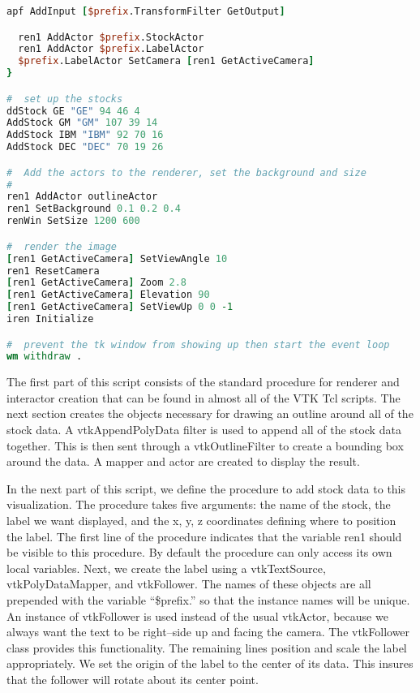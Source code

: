 \begin{lstlisting}[language=TCL, caption={Tcl script for stock case study.}]
  apf AddInput [$prefix.TransformFilter GetOutput]

  ren1 AddActor $prefix.StockActor
  ren1 AddActor $prefix.LabelActor
  $prefix.LabelActor SetCamera [ren1 GetActiveCamera]
}

#  set up the stocks
ddStock GE "GE" 94 46 4
AddStock GM "GM" 107 39 14
AddStock IBM "IBM" 92 70 16
AddStock DEC "DEC" 70 19 26

#  Add the actors to the renderer, set the background and size
#
ren1 AddActor outlineActor
ren1 SetBackground 0.1 0.2 0.4
renWin SetSize 1200 600

#  render the image
[ren1 GetActiveCamera] SetViewAngle 10
ren1 ResetCamera
[ren1 GetActiveCamera] Zoom 2.8
[ren1 GetActiveCamera] Elevation 90
[ren1 GetActiveCamera] SetViewUp 0 0 -1
iren Initialize

#  prevent the tk window from showing up then start the event loop
wm withdraw .
\end{lstlisting}

The first part of this script consists of the standard procedure for renderer and interactor creation that can be found in almost all of the VTK Tcl scripts. The next section creates the objects necessary for drawing an outline around all of the stock data. A vtkAppendPolyData filter is used to append all of the stock data together. This is then sent through a vtkOutlineFilter to create a bounding box around the data. A mapper and actor are created to display the result.

In the next part of this script, we define the procedure to add stock data to this visualization. The procedure takes five arguments: the name of the stock, the label we want displayed, and the x, y, z coordinates defining where to position the label. The first line of the procedure indicates that the variable ren1 should be visible to this procedure. By default the procedure can only access its own local variables. Next, we create the label using a vtkTextSource, vtkPolyDataMapper, and vtkFollower. The names of these objects are all prepended with the variable ``\$prefix.'' so that the instance names will be unique. An instance of vtkFollower is used instead of the usual vtkActor, because we always want the text to be right--side up and facing the camera. The vtkFollower class provides this functionality. The remaining lines position and scale the label appropriately. We set the origin of the label to the center of its data. This insures that the follower will rotate about its center point.

